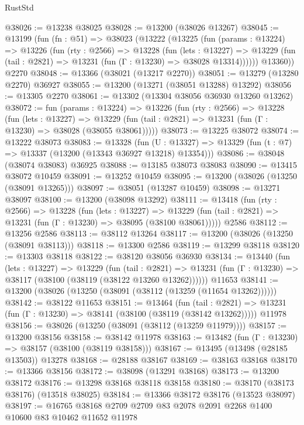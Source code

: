 \begin{lexlean}{RustStd}
\begin{coremodule}
@38026 := @13238 @38025
@38028 := @13200 (@38026 @13267)
@38045 := @13199
    (fun (fn : @51) =>
    @38023
      (@13222
        (@13225
          (fun (params : @13224) =>
          @13226
            (fun (rty : @2566) =>
            @13228
              (fun (lets : @13227) =>
              @13229 (fun (tail : @2821) => @13231 (fun (Γ : @13230) => @38028 @13314))))))
        @13360))
    @2270
@38048 := @13366 (@38021 (@13217 @2270))
@38051 := @13279 (@13280 @2270) @36927
@38055 := @13200 (@13271 (@38051 @13288) @13292)
@38056 := @13305 @2270
@38061 := @13302 (@13304 @38056 @36930 @13260 @13262)
@38072 := fun (params : @13224) =>
  @13226
    (fun (rty : @2566) =>
    @13228
      (fun (lets : @13227) =>
      @13229 (fun (tail : @2821) => @13231 (fun (Γ : @13230) => @38028 (@38055 @38061)))))
@38073 := @13225 @38072
@38074 := @13222 @38073
@38083 := @13328
    (fun (U : @13327) => @13329 (fun (t : @7) => @13337 (@13200 (@13343 @36927 @13218) @13354)))
@38086 := @38048 (@38074 @38083) @36925
@38088 := @13185 @38073 @38083
@38090 := @13415 @38072 @10459
@38091 := @13252 @10459
@38095 := @13200 (@38026 (@13250 (@38091 @13265)))
@38097 := @38051 (@13287 @10459)
@38098 := @13271 @38097
@38100 := @13200 (@38098 @13292)
@38111 := @13418
    (fun (rty : @2566) =>
    @13228
      (fun (lets : @13227) =>
      @13229 (fun (tail : @2821) => @13231 (fun (Γ : @13230) => @38095 (@38100 @38061)))))
    @2586
@38112 := @13256 @2586
@38113 := @38112 @13264
@38117 := @13200 (@38026 (@13250 (@38091 @38113)))
@38118 := @13300 @2586
@38119 := @13299 @38118
@38120 := @13303 @38118
@38122 := @38120 @38056 @36930
@38134 := @13440
    (fun (lets : @13227) =>
    @13229
      (fun (tail : @2821) =>
      @13231 (fun (Γ : @13230) => @38117 (@38100 (@38119 (@38122 @13260 @13262))))))
    @11653
@38141 := @13200 (@38026 (@13250 (@38091 (@38112 (@13259 (@11654 @13262))))))
@38142 := @38122 @11653
@38151 := @13464
    (fun (tail : @2821) => @13231 (fun (Γ : @13230) => @38141 (@38100 (@38119 (@38142 @13262)))))
    @11978
@38156 := @38026 (@13250 (@38091 (@38112 (@13259 @11979))))
@38157 := @13200 @38156
@38158 := @38142 @11978
@38163 := @13482 (fun (Γ : @13230) => @38157 (@38100 (@38119 @38158)))
@38167 := @13495 (@13498 (@28185 @13503)) @13278
@38168 := @28188 @38167
@38169 := @38163 @38168
@38170 := @13366 @38156
@38172 := @38098 (@13291 @38168)
@38173 := @13200 @38172
@38176 := @13298 @38168 @38118 @38158
@38180 := @38170 (@38173 @38176) (@13518 @38025)
@38184 := @13366 @38172 @38176 (@13523 @38097)
@38197 := @16765 @38168 @2709 @2709 @83 @2078 @2091 @2268 @1400 @10600 @83 @10462 @11652 @11978

\end{coremodule}
\end{lexlean}
